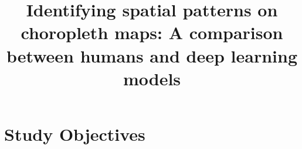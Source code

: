 

\title{Identifying spatial patterns on choropleth maps: A comparison between humans and deep learning models}



\iraggedright
\maketitle

\section{Study Objectives}







